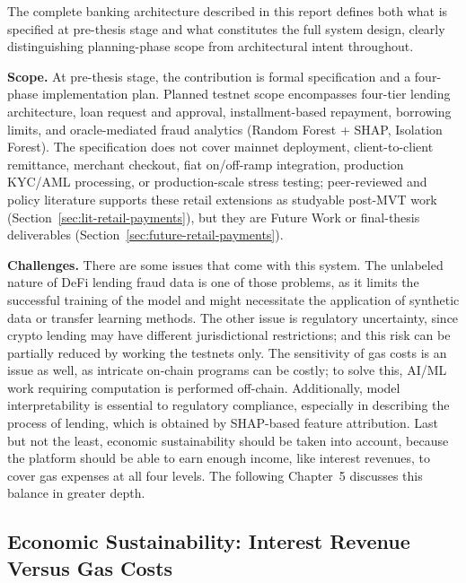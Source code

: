 \documentclass[12pt,a4paper]{report}
\begin{document}
\noindent The complete banking architecture described in this report defines both what is specified at pre-thesis stage and what constitutes the full system design, clearly distinguishing planning-phase scope from architectural intent throughout.

\textbf{Scope.} At pre-thesis stage, the contribution is formal specification and a four-phase implementation plan. Planned testnet scope encompasses four-tier lending architecture, loan request and approval, installment-based repayment, borrowing limits, and oracle-mediated fraud analytics (Random Forest + SHAP, Isolation Forest). The specification does not cover mainnet deployment, client-to-client remittance, merchant checkout, fiat on/off-ramp integration, production KYC/AML processing, or production-scale stress testing; peer-reviewed and policy literature supports these retail extensions as studyable post-MVT work (Section~\ref{sec:lit-retail-payments}), but they are Future Work or final-thesis deliverables (Section~\ref{sec:future-retail-payments}).

\textbf{Challenges.} There are some issues that come with this system. The unlabeled nature of DeFi lending fraud data is one of those problems, as it limits the successful training of the model and might necessitate the application of synthetic data or transfer learning methods. The other issue is regulatory uncertainty, since crypto lending may have different jurisdictional restrictions; and this risk can be partially reduced by working the testnets only. The sensitivity of gas costs is an issue as well, as intricate on-chain programs can be costly; to solve this, AI/ML work requiring computation is performed off-chain. Additionally, model interpretability is essential to regulatory compliance, especially in describing the process of lending, which is obtained by SHAP-based feature attribution. Last but not the least, economic sustainability should be taken into account, because the platform should be able to earn enough income, like interest revenues, to cover gas expenses at all four levels. The following Chapter~5 discusses this balance in greater depth.

\subsection{Economic Sustainability: Interest Revenue Versus Gas Costs}
\end{document}
